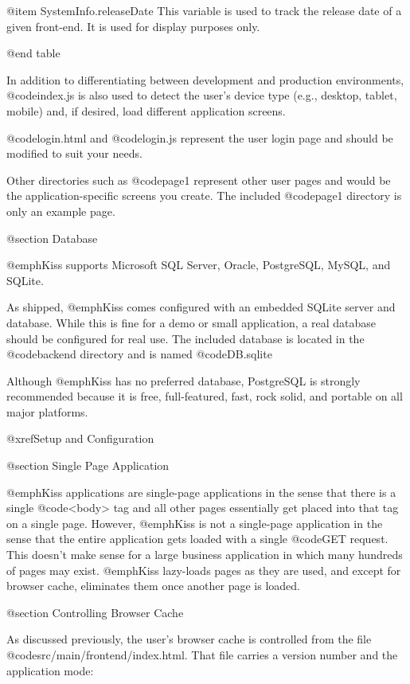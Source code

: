 @item SystemInfo.releaseDate 
This variable is used to track the release date of a given front-end.  It is used for display purposes only.

@end table

In addition to differentiating between development and production environments, @code{index.js}
is also used to detect the user's device type (e.g., desktop, tablet, mobile) and, if desired, 
load different application screens.


@code{login.html} and @code{login.js} represent the user login page
and should be modified to suit your needs.

Other directories such as @code{page1} represent other user pages and
would be the application-specific screens you create.  The included
@code{page1} directory is only an example page.

@section Database

@emph{Kiss} supports Microsoft SQL Server, Oracle, PostgreSQL, MySQL, and
SQLite.

As shipped, @emph{Kiss} comes configured with an embedded SQLite
server and database.  While this is fine for a demo or small
application, a real database should be configured for real use.
The included database is located in the @code{backend} directory
and is named @code{DB.sqlite}

Although @emph{Kiss} has no preferred database, PostgreSQL is strongly
recommended because it is free, full-featured, fast, rock solid, and
portable on all major platforms.

@xref{Setup and Configuration}


@section Single Page Application

@emph{Kiss} applications are single-page applications in the sense
that there is a single @code{<body>} tag and all other pages
essentially get placed into that tag on a single page.  However,
@emph{Kiss} is not a single-page application in the sense that the
entire application gets loaded with a single @code{GET} request.  This
doesn't make sense for a large business application in which many
hundreds of pages may exist.  @emph{Kiss} lazy-loads pages as they are
used, and except for browser cache, eliminates them once another page
is loaded.

@section Controlling Browser Cache

As discussed previously, the user's browser cache is controlled from the
file @code{src/main/frontend/index.html}.  That file carries a version
number and the application mode:


